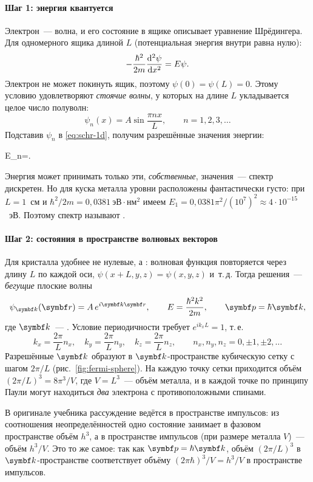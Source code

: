 \paragraph{Шаг 1: энергия квантуется}
Электрон~— волна, и его состояние в ящике описывает уравнение Шрёдингера.
Для одномерного ящика длиной $L$ (потенциальная энергия внутри равна
нулю):
\begin{equation}\label{eq:schr-1d}
-\frac{\hbar^2}{2m}\frac{\mathop{}\!\mathrm{d}^2\psi}{\mathop{}\!\mathrm{d} x^2}=E\psi .
\end{equation}
Электрон не может покинуть ящик, поэтому $\psi(0)=\psi(L)=0$. Этому
условию удовлетворяют \emph{стоячие волны}, у которых на длине $L$
укладывается целое число полуволн:
\[
\psi_n(x)=A\sin\frac{\pi n x}{L},\qquad n=1,2,3,\ldots
\]
Подставив $\psi_n$ в \eqref{eq:schr-1d}, получим разрешённые значения
энергии:
\begin{keyeq}\label{eq:box-levels}
E_n=.
\end{keyeq}
Энергия может принимать только эти, \emph{собственные}, значения~—
спектр дискретен. Но для куска металла уровни расположены фантастически
густо: при $L=1$~см и $\hbar^2/2m=0{,}0381~\text{эВ}\cdot\text{нм}^2$
имеем $E_1=0{,}0381\pi^2/(10^7)^2\approx4\cdot10^{-15}$~эВ. Поэтому
спектр называют .

\paragraph{Шаг 2: состояния в пространстве волновых векторов}
Для кристалла удобнее не нулевые, а : волновая функция повторяется через длину $L$ по каждой оси,
$\psi(x+L,y,z)=\psi(x,y,z)$ и~т.\,д. Тогда решения~— \emph{бегущие}
плоские волны
\[
\psi_{\vb k}(\vb r)=A\,e^{i\vb k\vb r},\qquad E=\frac{\hbar^2k^2}{2m},
\qquad \vb p=\hbar\vb k ,
\]
где $\vb k$~— . Условие периодичности требует
$e^{ik_xL}=1$, т.\,е.
\begin{equation}\label{eq:k-quant}
k_x=\frac{2\pi}{L}n_x,\quad k_y=\frac{2\pi}{L}n_y,\quad k_z=\frac{2\pi}{L}n_z,
\qquad n_x,n_y,n_z=0,\pm1,\pm2,\ldots
\end{equation}
Разрешённые $\vb k$ образуют в $\vb k$-пространстве кубическую сетку с
шагом $2\pi/L$ (рис.~\ref{fig:fermi-sphere}). На каждую точку сетки
приходится объём $(2\pi/L)^3=8\pi^3/V$, где $V=L^3$~— объём металла, и в
каждой точке по принципу Паули могут находиться \emph{два} электрона с
противоположными спинами.

\begin{smysl}
В оригинале учебника рассуждение ведётся в пространстве импульсов: из
соотношения неопределённостей одно состояние занимает в фазовом
пространстве объём $h^3$, а в пространстве импульсов (при размере
металла $V$)~— объём $h^3/V$. Это то же самое: так как $\vb p=\hbar\vb
k$, объём $(2\pi/L)^3$ в $\vb k$-пространстве соответствует объёму
$(2\pi\hbar)^3/V=h^3/V$ в пространстве импульсов.
\end{smysl}

